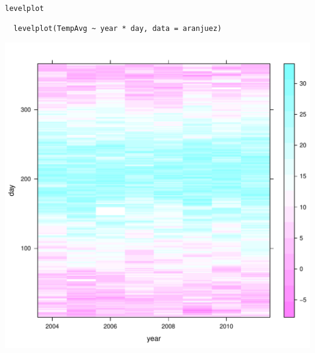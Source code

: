\documentclass[xcolor={usenames,svgnames,dvipsnames}]{beamer}
\begin{document}
\begin{frame}[fragile,label=sec-2-1-34]{\texttt{levelplot}}
 \lstset{language=R,label= ,caption= ,numbers=none}
\begin{lstlisting}
  levelplot(TempAvg ~ year * day, data = aranjuez)
\end{lstlisting}
\end{frame}

\begin{frame}[label=sec-2-1-35]{}
\includegraphics[width=.9\linewidth]{figs/levelplot.pdf}
\end{frame}
\end{document}

